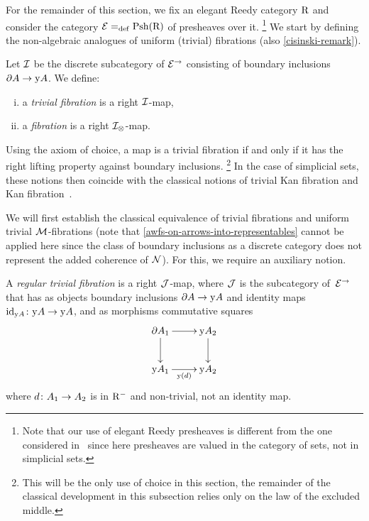 \documentclass[reqno,10pt,a4paper,oneside,draft]{amsart}
\begin{document}
\medskip

For the remainder of this section, we fix an elegant Reedy category $\R$ and consider the category $\calE \defeq \Rhat$ of presheaves over it.%
\footnote{Note that our use of elegant Reedy presheaves is different from the one considered in~\cite{shulman:reedy} since here presheaves are valued in the category of sets, not in simplicial sets.}
We start by defining the non-algebraic analogues of uniform (trivial) fibrations (\cf also \cref{cisinski-remark}).

\begin{definition}
Let $\cal{I}$ be the discrete subcategory of $\catE^{\to}$ consisting of boundary inclusions $\partial A \to \yon A$.
We define:
\begin{enumerate}[(i)]
\item a \emph{trivial fibration} is a right $\cal{I}$-map,
\item a \emph{fibration} is a right $\cal{I}_\otimes$-map.
\end{enumerate}
\end{definition}

Using the axiom of choice, a map is a trivial fibration if and only if it has the right lifting property against boundary inclusions.%
\footnote{This will be the only use of choice in this section, the remainder of the classical development in this subsection relies only on the law of the excluded middle.}
In the case of simplicial sets, these notions then coincide with the classical notions of trivial Kan fibration and Kan fibration~\cite[Chap.~IV, Sec.~2]{gabriel-zisman:calculus-of-fractions}.

\medskip

We will first establish the classical equivalence of trivial fibrations and uniform trivial $\cal{M}$-fibrations (note that \cref{awfs-on-arrows-into-representables} cannot be applied here since the class of boundary inclusions as a discrete category does not represent the added coherence of $\cal{N}$).
For this, we require an auxiliary notion.

\begin{definition}
A \emph{regular trivial fibration} is a right $\cal{J}$-map, where $\cal{J}$ is the subcategory of~$\catE^{\to}$ that has as objects boundary inclusions $\partial A \to \yon A$ and identity maps $\id_{\yon A} \co \yon A \to \yon A$, and as morphisms commutative squares
\[
\xymatrix{
  \partial A_1
  \ar[r]
  \ar[d]
&
  \yon A_2
  \ar[d]
\\
  \yon A_1
  \ar[r]_{\yon(d)}
&
  \yon A_2
}
\]
where $d \co A_1 \to A_2$ is in $\Rm$ and non-trivial, \ie not an identity map.
\end{definition}
\end{document}
